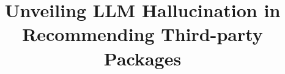 \documentclass[acmsmall,screen,review,anonymous]{acmart}
\theoremstyle{acmdefinition}
\begin{document}
    \title{Unveiling LLM Hallucination in Recommending Third-party Packages}

    


    \begin{abstract}
        
    \end{abstract}

    \maketitle

    
    
    
    
    

    
    
    
    

    
    
\end{document}
